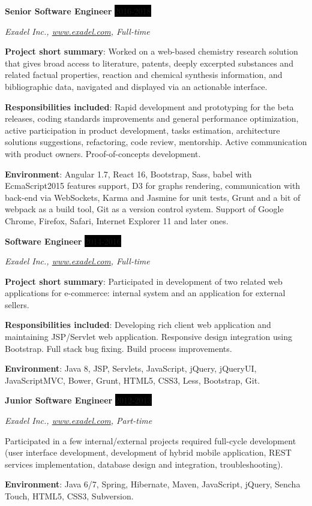 \documentclass[paper=a4,fontsize=11pt]{scrartcl} %
\newcommand{\sepspace}{\vspace*{1em}}		%
\newcommand{\EducationEntry}[4]{
		\noindent \textbf{#1} \hfill      %
		\colorbox{Black}{%
			\parbox{6em}{%
			\hfill\color{White}#2}} \par  %
		\noindent \textit{#3} \par        %
			\noindent\hangindent=2em\hangafter=0 \small #4 %
		\normalsize \par}
\newcommand{\WorkEntry}[4]{				  %
			\noindent \textbf{#1} \hfill      %
		\colorbox{Black}{\color{White}#2} \par  %
		\noindent \textit{#3} \par              %
		\hangafter=0 \small #4 %
		\normalsize \par}
\begin{document}
\sepspace

\WorkEntry{Senior Software Engineer}{2016-2018}{Exadel Inc., \url{www.exadel.com},  Full-time}{
\textbf{Project short summary}: Worked on a web-based chemistry research solution that gives broad access to literature, patents, deeply excerpted substances and related factual properties, reaction and chemical synthesis information, and bibliographic data, navigated and displayed via an actionable interface.

\textbf{Responsibilities included}: Rapid development and prototyping for the beta releases, coding standards improvements and general performance optimization, active participation in product development, tasks estimation, architecture solutions suggestions, refactoring, code review, mentorship. Active communication with product owners. Proof-of-concepts development. 

\textbf{Environment}: Angular 1.7, React 16, Bootstrap, Sass, babel with EcmaScript2015 features support, D3 for graphs rendering, communication with back-end via WebSockets, Karma and Jasmine for unit tests, Grunt and a bit of webpack as a build tool, Git as a version control system. Support of Google Chrome, Firefox, Safari, Internet Explorer 11 and later ones.}
\sepspace

\WorkEntry{Software Engineer}{2014-2016}{Exadel Inc., \url{www.exadel.com}, Full-time}{
\textbf{Project short summary}: Participated in development of two related web applications for e-commerce: internal system and an application for external sellers.

\textbf{Responsibilities included}: Developing rich client web application and maintaining JSP/Servlet web application. Responsive design integration using Bootstrap. Full stack bug fixing. Build process improvements.

\textbf{Environment}: Java 8, JSP, Servlets, JavaScript, jQuery, jQueryUI, JavaScriptMVC, Bower, Grunt, HTML5, CSS3, Less, Bootstrap, Git.}
\sepspace

\WorkEntry{Junior Software Engineer}{2012-2013}{Exadel Inc., \url{www.exadel.com}, Part-time}{Participated in a few internal/external projects required full-cycle development (user interface development, development of hybrid mobile application, REST services implementation, database design and integration, troubleshooting).

\textbf{Environment}: Java 6/7, Spring, Hibernate, Maven, JavaScript, jQuery, Sencha Touch, HTML5, CSS3, Subversion.
}
\end{document}
